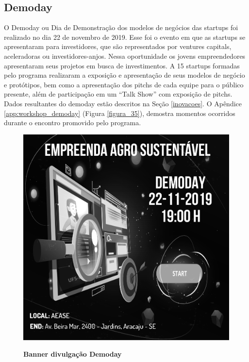 \subsection{Demoday}

O Demoday ou Dia de Demonstração dos modelos de negócios das startups foi realizado no dia 22 de novembro de 2019. Esse foi o evento em que as startups se apresentaram para investidores, que são representados por ventures capitals, aceleradoras ou investidores-anjos. Nessa oportunidade os jovens empreendedores apresentaram seus projetos em busca de investimentos. A 15 startups formadas pelo programa realizaram a exposição e apresentação de seus modelos de negócio e protótipos, bem como a apresentação dos pitchs de cada equipe para o público presente, além de participação em um “Talk Show” com exposição de pitchs. Dados resultantes do demoday estão descritos na Seção \ref{inovacoes}. 
O Apêndice \ref{app:workshop_demoday} (Figura \ref{figura_35}), demostra momentos ocorridos durante o encontro promovido pelo programa.



\begin{figure}[H]
\centering
\caption{\textbf{Banner divulgação Demoday}}
\includegraphics[scale=0.3]{Imagens/demoday_banner.png}
\label{fig:ods}
\end{figure}







